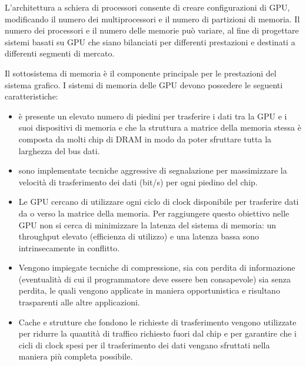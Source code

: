 L'architettura a schiera di processori consente di creare configurazioni di GPU, modificando il numero dei multiprocessori e il numero di partizioni di memoria. Il numero dei processori e il numero delle memorie può variare, al fine di progettare sistemi basati su GPU che siano bilanciati per differenti prestazioni e destinati a differenti segmenti di mercato.

Il sottosistema di memoria è il componente principale per le prestazioni del sistema grafico. I sistemi di memoria delle GPU devono possedere le seguenti caratteristiche:

\begin{itemize}
  \item {} è presente un elevato numero di piedini per trasferire i dati tra  la GPU e i suoi dispositivi di memoria e che la struttura a matrice della memoria stessa è composta da molti chip di DRAM in modo da poter sfruttare tutta la larghezza del bus dati. 
  \item {} sono implementate tecniche aggressive di segnalazione per massimizzare la velocità di trasferimento dei dati (bit/s) per ogni piedino del chip.
  \item Le GPU cercano di utilizzare ogni ciclo di clock disponibile per trasferire dati da o verso la matrice della memoria. Per raggiungere questo obiettivo nelle GPU non si cerca di minimizzare la latenza del sistema di memoria: un throughput elevato (efficienza di utilizzo) e una latenza bassa sono intrinsecamente in conflitto. 
  \item Vengono impiegate tecniche di compressione, sia con perdita di informazione (eventualità di cui il programmatore deve essere ben consapevole) sia senza perdita, le quali vengono applicate in maniera opportunistica e risultano trasparenti alle altre applicazioni. 
  \item Cache e strutture che fondono le richieste di trasferimento vengono utilizzate per ridurre la quantità di traffico richiesto fuori dal chip e per garantire che i cicli di clock spesi per il trasferimento dei dati vengano sfruttati nella maniera più completa possibile.
\end{itemize}



